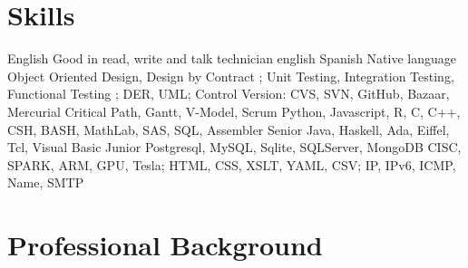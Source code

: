 \section{Skills}
        {English}
        {Good in read, write and talk technician english}
        {}
        {}
        {}
\cventry{}
        {Spanish}
        {Native language}
        {}
        {}
        {}
        {Object Oriented Design, Design by Contract ; Unit Testing, Integration Testing, Functional Testing ; DER, UML; Control Version: CVS, SVN, GitHub, Bazaar, Mercurial}
        {}
        {}
        {}
        {}
        {Critical Path, Gantt, V-Model, Scrum}
        {}
        {}
        {}
        {}
        {Python, Javascript, R, C, C++, CSH, BASH, MathLab, SAS, SQL, Assembler}
        {Senior}
        {}
        {}
        {}
\cventry{}
        {Java, Haskell, Ada, Eiffel, Tcl, Visual Basic}
        {Junior}
        {}
        {}
        {}
        {Postgresql, MySQL, Sqlite, SQLServer, MongoDB}
        {}
        {}
        {}
        {}
        {CISC, SPARK, ARM, GPU, Tesla; HTML, CSS, XSLT, YAML, CSV; IP, IPv6, ICMP, Name, SMTP}
        {}
        {}
        {}
        {}

	\pagebreak[4]

\section{Professional Background}\label{profesional:desde}

